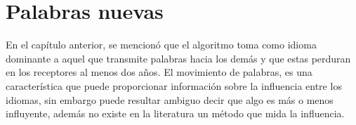 \chapter{Palabras nuevas}



En el capítulo anterior, se mencionó que el algoritmo toma como  idioma
dominante a aquel que transmite palabras hacia los demás y que estas perduran en los receptores al menos dos años.  El movimiento de palabras, es una característica que puede proporcionar información sobre la influencia entre los idiomas, sin embargo  puede resultar ambiguo decir que algo es más o menos influyente, además  no existe en la literatura un método que mida la influencia.






% 
% 



 




